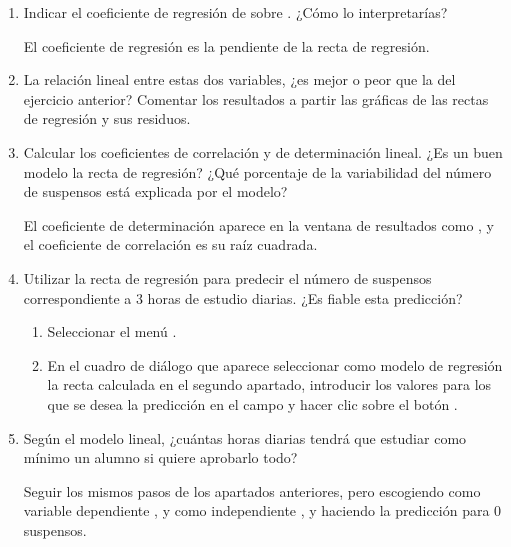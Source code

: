 \begin{enumerate}[leftmargin=*]
\begin{enumerate}
\item Indicar el coeficiente de regresión de  sobre . 
¿Cómo lo interpretarías?
\begin{indicacion}{
El coeficiente de regresión es la pendiente de la recta de regresión.}
\end{indicacion}

\item La relación lineal entre estas dos variables, ¿es mejor o peor que la del ejercicio anterior? 
Comentar los resultados a partir las gráficas de las rectas de regresión y sus residuos.

\item Calcular los coeficientes de correlación y de determinación lineal. 
¿Es un buen modelo la recta de regresión?
¿Qué porcentaje de la variabilidad del número de suspensos está explicada por el modelo?
\begin{indicacion}{
El coeficiente de determinación aparece en la ventana de resultados como , y el
coeficiente de correlación es su raíz cuadrada.}
\end{indicacion}

\item Utilizar la recta de regresión para predecir el número de suspensos correspondiente a 3 horas de estudio diarias.
¿Es fiable esta predicción? \begin{indicacion}{
\begin{enumerate}
\item Seleccionar el menú .
\item En el cuadro de diálogo que aparece seleccionar como modelo de regresión la recta calculada en el segundo
apartado, introducir los valores para los que se desea la predicción en el campo  y hacer clic
sobre el botón .
\end{enumerate}}
\end{indicacion}

\item Según el modelo lineal, ¿cuántas horas diarias tendrá que estudiar como mínimo un alumno si quiere aprobarlo
todo?
\begin{indicacion}{
Seguir los mismos pasos de los apartados anteriores, pero escogiendo como variable dependiente ,
y como independiente , y haciendo la predicción para 0 suspensos.}
\end{indicacion}
\end{enumerate}



\end{enumerate}
